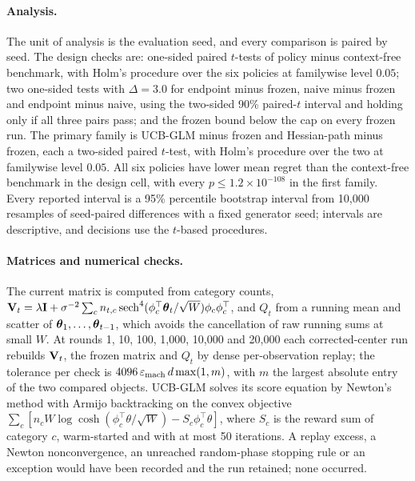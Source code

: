 \paragraph{Analysis.}
The unit of analysis is the evaluation seed, and every comparison is paired by
seed. The design checks are: one-sided paired $t$-tests of policy minus
context-free benchmark, with Holm's procedure over the six policies at
familywise level $0.05$; two one-sided tests with $\Delta=3.0$ for endpoint
minus frozen, naive minus frozen and endpoint minus naive, using the
two-sided 90\% paired-$t$ interval and holding only if all three pairs pass;
and the frozen bound below the cap on every frozen run. The primary family is
UCB-GLM minus frozen and Hessian-path minus frozen, each a two-sided paired $t$-test,
with Holm's procedure over the two at familywise level $0.05$. All six
policies have lower mean regret than the context-free benchmark in the design
cell, with every $p\le1.2\times10^{-108}$ in the first family. Every reported
interval is a 95\% percentile bootstrap interval from 10,000 resamples of
seed-paired differences with a fixed generator seed; intervals are
descriptive, and decisions use the $t$-based procedures.

\paragraph{Matrices and numerical checks.}
The current matrix is computed from category counts,
$\mathbf{V}_t=\lambda\mathbf{I}+\sigma^{-2}\sum_cn_{t,c}\operatorname{sech}^4
(\phi_c^\top\boldsymbol{\theta}_t/\sqrt W)\phi_c\phi_c^\top$, and $Q_t$ from a running mean
and scatter of $\boldsymbol{\theta}_1,\ldots,\boldsymbol{\theta}_{t-1}$, which avoids the cancellation
of raw running sums at small $W$. At rounds 1, 10, 100, 1,000, 10,000 and
20,000 each corrected-center run rebuilds $\mathbf{V}_t$, the frozen matrix and $Q_t$
by dense per-observation replay; the tolerance per check is
$4096\,\varepsilon_{\rm mach}\,d\max(1,m)$, with $m$ the largest absolute entry
of the two compared objects. UCB-GLM solves its score equation by Newton's
method with Armijo backtracking on the convex objective
$\sum_c[n_cW\log\cosh(\phi_c^\top\theta/\sqrt W)-S_c\phi_c^\top\theta]$, where
$S_c$ is the reward sum of category $c$, warm-started and with at most 50
iterations. A replay excess, a Newton nonconvergence, an unreached random-phase
stopping rule or an exception would have been recorded and the run retained;
none occurred.
